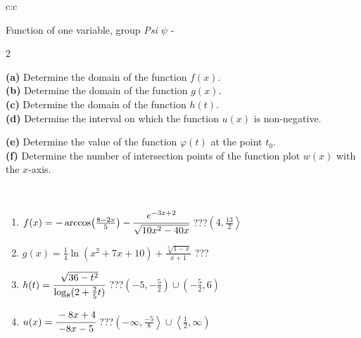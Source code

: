 \documentclass[10pt]{report}
\begin{document}
\begin{tabular}{c:c}
\begin{minipage}[c][104.5mm][t]{0.5\linewidth}
\begin{center}
\vspace{7mm}
{\huge Function of one variable, group \textit{Psi $\psi$} -}\\[5mm]
\begin{minipage}{0.95\linewidth}
\begin{center}
{\small \begin{multicols}{2} \raggedright
\textbf{(a)} Determine the domain of the function \(f(x)\). \\[1mm]
\textbf{(b)} Determine the domain of the function \(g(x)\). \\[1mm]
\textbf{(c)} Determine the domain of the function \(h(t)\). \\[1mm]
\textbf{(d)} Determine the interval on which the function \(u(x)\) is non-negative. \par \columnbreak
\textbf{(e)} Determine the value of the function \(\varphi(t)\) at the point \(t_0\). \\[1mm]
\textbf{(f)} Determine the number of intersection points of the function plot \(w(x)\) with the \(x\)-axis. \\[1mm]
\end{multicols}
}
\end{center}
\end{minipage}
\\[4mm]
\begin{minipage}{0.79\linewidth}
\begin{center}
\begin{varwidth}{\linewidth}
\begin{enumerate}
\small
\item $f(x) = -\arccos\!\left( \frac{8-2x}{5} \right) - \cfrac{e^{-3x+2}}{\sqrt{10x^2-40x}}$\quad \dotfill\; ???\;\dotfill \quad $\left(4 , \frac{13}{2}\right\rangle$
\item $g(x) = \frac{1}{4} \ln{\!(x^2+7x+10)}+\frac{\sqrt[3]{1-x}}{x+1}$\quad \dotfill\; ???\;\dotfill {}
\item $h(t) = \cfrac{\sqrt{36-t^2}}{\log_8(2+\frac{2}{5}t)}$\quad \dotfill\; ???\;\dotfill \quad $\left(-5 , -\frac{5}{2}\right)\cup\left(-\frac{5}{2} , 6\right)$
\item $u(x) = \cfrac{-8x+4}{-8x-5}$\quad \dotfill\; ???\;\dotfill \quad $\left(-\infty , \frac{-5}{8}\right\rangle\cup\left\langle\frac{1}{2} , \infty\right)$

\end{enumerate}
\end{varwidth}
\end{center}
\end{minipage}
\end{center}
\end{minipage}
\end{tabular}
\end{document}
